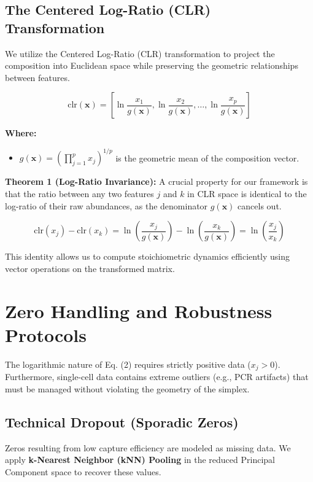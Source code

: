 \documentclass[11pt, a4paper]{article}
\begin{document}
\subsection{The Centered Log-Ratio (CLR) Transformation}
We utilize the Centered Log-Ratio (CLR) transformation to project the composition into Euclidean space while preserving the geometric relationships between features.

\begin{equation}
\text{clr}(\mathbf{x}) = \left[ \ln\frac{x_1}{g(\mathbf{x})}, \ln\frac{x_2}{g(\mathbf{x})}, \dots, \ln\frac{x_p}{g(\mathbf{x})} \right]
\end{equation}

\noindent\textbf{Where:}
\begin{itemize}
    \item $g(\mathbf{x}) = \left(\prod_{j=1}^p x_j\right)^{1/p}$ is the geometric mean of the composition vector.
\end{itemize}

\textbf{Theorem 1 (Log-Ratio Invariance):} A crucial property for our framework is that the ratio between any two features $j$ and $k$ in CLR space is identical to the log-ratio of their raw abundances, as the denominator $g(\mathbf{x})$ cancels out.

\begin{equation}
\text{clr}(x_j) - \text{clr}(x_k) = \ln\left(\frac{x_j}{g(\mathbf{x})}\right) - \ln\left(\frac{x_k}{g(\mathbf{x})}\right) = \ln\left(\frac{x_j}{x_k}\right)
\end{equation}

This identity allows us to compute stoichiometric dynamics efficiently using vector operations on the transformed matrix.

\section{Zero Handling and Robustness Protocols}

The logarithmic nature of Eq. (2) requires strictly positive data ($x_j > 0$). Furthermore, single-cell data contains extreme outliers (e.g., PCR artifacts) that must be managed without violating the geometry of the simplex.

\subsection{Technical Dropout (Sporadic Zeros)}
Zeros resulting from low capture efficiency are modeled as missing data. We apply \textbf{k-Nearest Neighbor (kNN) Pooling} in the reduced Principal Component space to recover these values.
\end{document}

